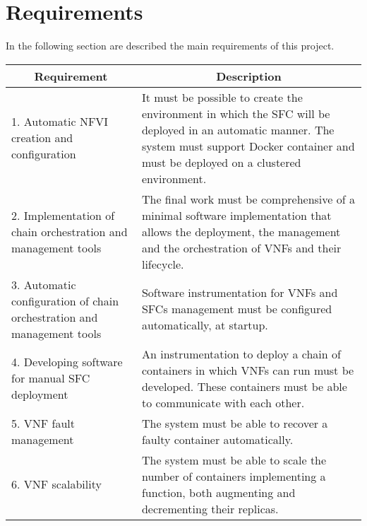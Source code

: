 \section{Requirements}\label{chap:prjan:sec:req}
In the following section are described the main requirements of this project.

\begin{longtable}[c]{p{}p{}}
\hline
\multicolumn{1}{c}{\textbf{Requirement}}                                & \multicolumn{1}{c}{\textbf{Description}}                                                                                                                                                       \\ \hline
\endhead
%
\hline
\endfoot
%
\endlastfoot
%
1. Automatic NFVI creation and configuration                            & It must be possible to create the environment in which the SFC will be deployed in an automatic manner. The system must support Docker container and must be deployed on a clustered environment. \\
2. Implementation of chain orchestration and management tools           & The final work must be comprehensive of a minimal software implementation that allows the deployment, the management and the orchestration of VNFs and their lifecycle.                      \\
3. Automatic configuration of chain orchestration and management tools & Software instrumentation for VNFs and SFCs management must be configured automatically, at startup.                                                                                              \\
4. Developing software for manual SFC deployment                        & An instrumentation to deploy a chain of containers in which VNFs can run must be developed. These containers must be able to communicate with each other.                                                \\
5. VNF fault management                                                 & The system must be able to recover a faulty container automatically.                                                                                                                      \\
6. VNF scalability                                                      & The system must be able to scale the number of containers implementing a function, both augmenting and decrementing their replicas.                                                               \\

\end{longtable}
